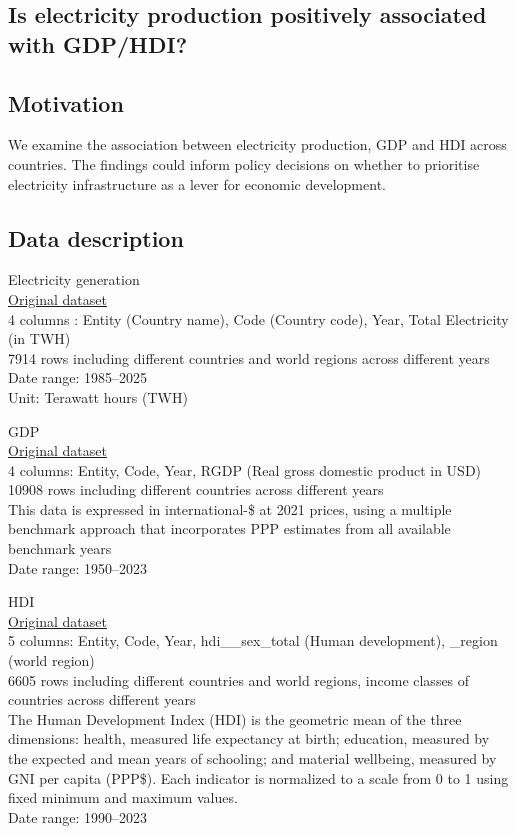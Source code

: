 \documentclass{article}
\begin{document}
	\begin{center}
		\section*{Is electricity production positively associated with GDP/HDI?}
	\end{center}

	\subsection*{Motivation}
		\par{}
			We examine the association between electricity production, GDP and HDI across countries.
The findings could inform policy decisions on whether to prioritise electricity infrastructure as a lever for economic development.
	\subsection*{Data description}
		\par{Electricity generation}
\\		\href{https://ourworldindata.org/grapher/electricity-generation.csv?v=1&csvType=full&useColumnShortNames=true}{Original dataset}
\\4 columns : Entity (Country name), Code (Country code), Year, Total Electricity (in TWH)
\\7914 rows including different countries and world regions across different years 
\\Date range: 1985–2025
\\Unit: Terawatt hours (TWH)
		\par{GDP}
		\\\href{https://ourworldindata.org/grapher/gdp-penn-world-table.csv?v=1&csvType=full&useColumnShortNames=true}{Original dataset}
\\4 columns: Entity, Code, Year, RGDP (Real gross domestic product in USD)
\\10908 rows including different countries across different years 
\\This data is expressed in international-\$ at 2021 prices, using a multiple benchmark approach that incorporates PPP estimates from all available benchmark years
\\Date range: 1950–2023
		\par{HDI}
		\\\href{https://ourworldindata.org/grapher/human-development-index.csv?v=1&csvType=full&useColumnShortNames=true}{Original dataset} 
\\ 5 columns: Entity, Code, Year, hdi\_\_sex\_total (Human development), \_region (world region)
\\6605 rows including different countries and world regions, income classes of countries across different years 
\\The Human Development Index (HDI) is the geometric mean of the three dimensions: health, measured life expectancy at birth; education, measured by the expected and mean years of schooling; and material wellbeing, measured by GNI per capita (PPP\$). Each indicator is normalized to a scale from 0 to 1 using fixed minimum and maximum values. 
\\Date range: 1990–2023
\end{document}
